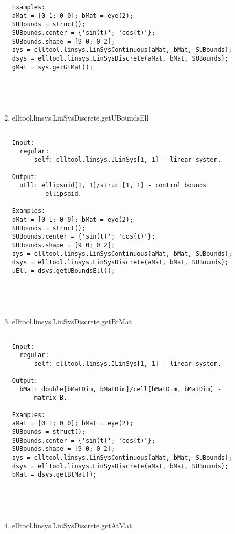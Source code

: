 \begin{enumerate}
\begin{lstlisting}
Examples:
aMat = [0 1; 0 0]; bMat = eye(2);
SUBounds = struct();
SUBounds.center = {'sin(t)'; 'cos(t)'};
SUBounds.shape = [9 0; 0 2];
sys = elltool.linsys.LinSysContinuous(aMat, bMat, SUBounds);
dsys = elltool.linsys.LinSysDiscrete(aMat, bMat, SUBounds);
gMat = sys.getGtMat();





\end{lstlisting}
\fontfamily{\familydefault}
\selectfont
\item {elltool.linsys.LinSysDiscrete.getUBoundsEll}
\selectfont
\begin{lstlisting}

Input:
  regular:
      self: elltool.linsys.ILinSys[1, 1] - linear system.

Output:
  uEll: ellipsoid[1, 1]/struct[1, 1] - control bounds
         ellipsoid.

Examples:
aMat = [0 1; 0 0]; bMat = eye(2);
SUBounds = struct();
SUBounds.center = {'sin(t)'; 'cos(t)'};
SUBounds.shape = [9 0; 0 2];
sys = elltool.linsys.LinSysContinuous(aMat, bMat, SUBounds);
dsys = elltool.linsys.LinSysDiscrete(aMat, bMat, SUBounds);
uEll = dsys.getUBoundsEll();





\end{lstlisting}
\fontfamily{\familydefault}
\selectfont
\item {elltool.linsys.LinSysDiscrete.getBtMat}
\selectfont
\begin{lstlisting}

Input:
  regular:
      self: elltool.linsys.ILinSys[1, 1] - linear system.

Output:
  bMat: double[bMatDim, bMatDim]/cell[bMatDim, bMatDim] -
      matrix B.

Examples:
aMat = [0 1; 0 0]; bMat = eye(2);
SUBounds = struct();
SUBounds.center = {'sin(t)'; 'cos(t)'};
SUBounds.shape = [9 0; 0 2];
sys = elltool.linsys.LinSysContinuous(aMat, bMat, SUBounds);
dsys = elltool.linsys.LinSysDiscrete(aMat, bMat, SUBounds);
bMat = dsys.getBtMat();





\end{lstlisting}
\fontfamily{\familydefault}
\selectfont
\item {elltool.linsys.LinSysDiscrete.getAtMat}
\selectfont
\begin{lstlisting}


\end{lstlisting}
\end{enumerate}
